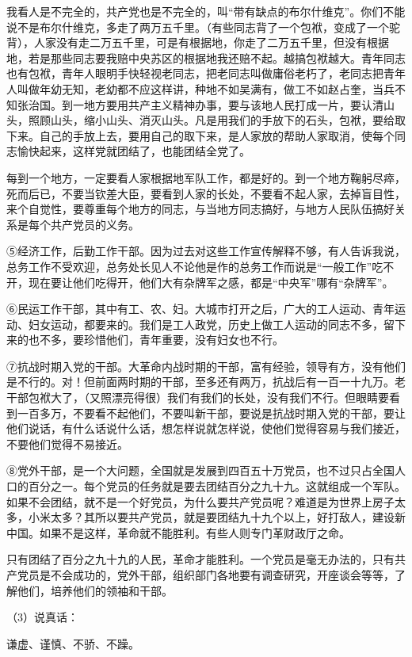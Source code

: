 我看人是不完全的，共产党也是不完全的，叫“带有缺点的布尔什维克”。你们不能说不是布尔什维克，多走了两万五千里。（有些同志背了一个包袱，变成了一个驼背），人家没有走二万五千里，可是有根据地，你走了二万五千里，但没有根据地，若是那些同志要我赔中央苏区的根据地我还赔不起。越搞包袱越大。青年同志也有包袱，青年人眼明手快轻视老同志，把老同志叫做庸俗老朽了，老同志把青年人叫做年幼无知，老幼都不应这样讲，种地不如吴满有，做工不如赵占奎，当兵不知张治国。到一地方要用共产主义精神办事，要与该地人民打成一片，要认清山头，照顾山头，缩小山头、消灭山头。凡是用我们的手放下的石头，包袱，要给取下来。自己的手放上去，要用自己的取下来，是人家放的帮助人家取消，使每个同志愉快起来，这样党就团结了，也能团结全党了。

每到一个地方，一定要看人家根据地军队工作，都是好的。到一个地方鞠躬尽瘁，死而后已，不要当钦差大臣，要看到人家的长处，不要看不起人家，去掉盲目性，来个自觉性，要尊重每个地方的同志，与当地方同志搞好，与地方人民队伍搞好关系是每个共产党员的义务。

⑤经济工作，后勤工作干部。因为过去对这些工作宣传解释不够，有人告诉我说，总务工作不受欢迎，总务处长见人不论他是作的总务工作而说是“一般工作”吃不开，现在要让他们吃得开，他们大有杂牌军之感，都是“中央军”哪有“杂牌军”。

⑥民运工作干部，其中有工、农、妇。大城市打开之后，广大的工人运动、青年运动、妇女运动，都要来的。我们是工人政党，历史上做工人运动的同志不多，留下来的也不多，要珍惜他们，青年重要，没有妇女也不行。

⑦抗战时期入党的干部。大革命内战时期的干部，富有经验，领导有方，没有他们是不行的。对！但前面两时期的干部，至多还有两万，抗战后有一百一十九万。老干部包袱大了，（又照漂亮得很）我们有我们的长处，没有我们不行。但眼睛要看到一百多万，不要看不起他们，不要叫新干部，要说是抗战时期入党的干部，要让他们说话，有什么话说什么话，想怎样说就怎样说，使他们觉得容易与我们接近，不要他们觉得不易接近。

⑧党外干部，是一个大问题，全国就是发展到四百五十万党员，也不过只占全国人口的百分之一。每个党员的任务就是要去团结百分之九十九。这就组成一个军队。如果不会团结，就不是一个好党员，为什么要共产党员呢？难道是为世界上房子太多，小米太多？其所以要共产党员，就是要团结九十九个以上，好打敌人，建设新中国。如果不是这样，革命就不能胜利。有些人则专门革财政厅之命。

只有团结了百分之九十九的人民，革命才能胜利。一个党员是毫无办法的，只有共产党员是不会成功的，党外干部，组织部门各地要有调查研究，开座谈会等等，了解他们，培养他们的领袖和干部。

（3）说真话：

谦虚、谨慎、不骄、不躁。

